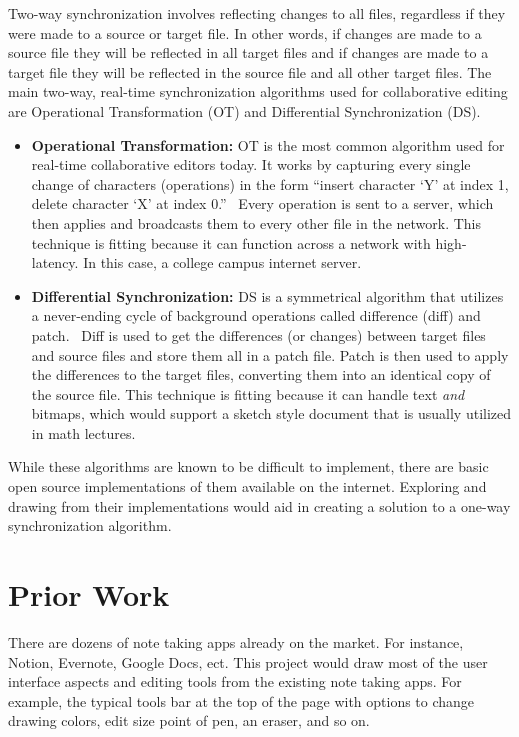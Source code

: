 \documentclass[10pt,twocolumn]{article}
\begin{document}
Two-way synchronization involves reflecting changes to all files, regardless if they were made to a source or target file. In other words, if changes are made to a source file they will be reflected in all target files and if changes are made to a target file they will be reflected in the source file and all other target files. The main two-way, real-time synchronization algorithms used for collaborative editing are Operational Transformation (OT) and Differential Synchronization (DS). 
\begin{itemize}
    \item \textbf{Operational Transformation:} OT is the most common algorithm used for real-time collaborative editors today. It works by capturing every single change of characters (operations) in the form “insert character ‘Y’ at index 1, delete character ‘X’ at index 0.”~\cite{gala_2019} Every operation is sent to a server, which then applies and broadcasts them to every other file in the network. This technique is fitting because it can function across a network with high-latency. In this case, a college campus internet server. 
    \item \textbf{Differential Synchronization:} DS is a symmetrical algorithm that utilizes a never-ending cycle of background operations called difference (diff) and patch.~\cite{35605} Diff is used to get the differences (or changes) between target files and source files and store them all in a patch file. Patch is then used to apply the differences to the target files, converting them into an identical copy of the source file. This technique is fitting because it can handle text \textit{and} bitmaps, which would support a sketch style document that is usually utilized in math lectures. 
\end{itemize}

While these algorithms are known to be difficult to implement, there are basic open source implementations of them available on the internet. Exploring and drawing from their implementations would aid in creating a solution to a one-way synchronization algorithm.

\section{Prior Work}
There are dozens of note taking apps already on the market. For instance, Notion, Evernote, Google Docs, ect. This project would draw most of the user interface aspects and editing tools from the existing note taking apps. For example, the typical tools bar at the top of the page with options to change drawing colors, edit size point of pen, an eraser, and so on. 
\end{document}
